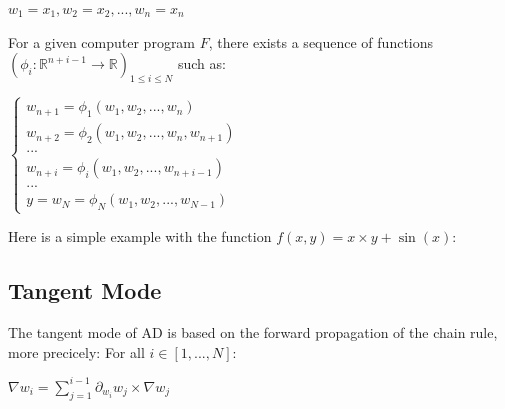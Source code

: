 \documentclass {article}
\begin{document}
			\begin{center}
				$w_{1} = x_{1}, w_{2} = x_{2}, ..., w_{n} = x_{n}$
			\end{center}
			
			For a given computer program $F$, there exists a sequence of functions $(\phi_{i}: \mathbb{R}^{n+i-1} \longrightarrow \mathbb{R})_{1 \leq i \leq N}$ such as:
			
			\begin{center}
				$\begin{cases} w_{n+1} = \phi_{1} (w_{1}, w_{2}, ...,  w_{n}) \\ w_{n+2} = \phi_{2} (w_{1}, w_{2}, ...,  w_{n}, w_{n+1}) \\ ... \\ w_{n+i} = \phi_{i} (w_{1}, w_{2}, ..., w_{n+i-1}) \\ ... \\ y = w_{N} = \phi_{N} (w_{1}, w_{2}, ...,  w_{N-1}) \end{cases}$
			\end{center}
			
			Here is a simple example with the function $f (x, y) = x \times y + \sin (x)$: \\
			
			
		\subsection{Tangent Mode}
		
			The tangent mode of AD is based on the forward propagation of the chain rule, more precicely:
			For all $i \in \left[ 1,..., N \right]$:

				\begin{center}
					$\nabla w_{i} = \sum_{j=1}^{i-1} {\partial_{w_{i}} w_{j} \times \nabla w_{j}}$
				\end{center}
				
\end{document}
